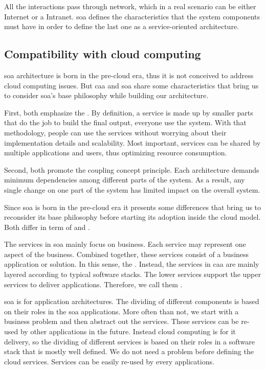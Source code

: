 All the interactions pass through network, which in a real scenario can be either Internet or a Intranet.
\ac{soa} defines the characteristics that the system components must have in order to
define the last one as a service-oriented architecture.

\subsection{Compatibility with cloud computing}
\label{sec:architecture-soa-compatibility}
\ac{soa} architecture is born in the pre-cloud era, thus it is not conceived to address cloud computing
issues. But \ac{caa} and \ac{soa} share some characteristics that bring us to consider \ac{soa}'s base
philosophy while building our architecture.

First, both emphasize the . By definition, a service is made up by smaller parts
that do the job to build the final output, everyone use the  system. With that methodology,
people can use the services without worrying about their implementation details and scalability. Most
important, services can be shared by multiple applications and users, thus optimizing resource consumption.

Second, both promote the  coupling concept principle. Each architecture demands minimum
dependencies among different parts of the system. As a result, any single change on one part of the system
has limited impact on the overall system.

Since \ac{soa} is born in the pre-cloud era it presents some differences that bring us to reconsider its
base philosophy before starting its adoption inside the cloud model. Both differ in term of
 and .

The services in \ac{soa} mainly focus on business. Each service may represent one aspect of the business.
Combined together, these services consist of a business application or solution. In this sense, the 
. Instead, the services in \ac{caa} are mainly layered according to 
typical software stacks. The lower services support the upper services to deliver applications. Therefore,
we call them .

\ac{soa} is for application architectures. The dividing of different components is based on their roles in
the \ac{soa} applications. More often than not, we start with a business problem and then abstract out the
services. These services can be re-used by other applications in the future. Instead cloud computing is for
\acs{it} delivery, so the dividing of different services is based on their roles in a software stack that is
mostly well defined. We do not need a problem before defining the cloud services. Services can be easily
re-used by every applications.

